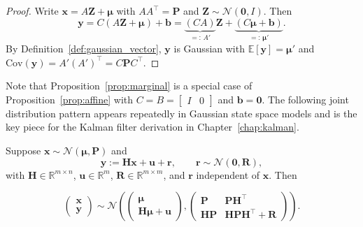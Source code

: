 \begin{proof}
Write $\mathbf{x} = A\mathbf{Z} + \boldsymbol{\mu}$ with $AA^\top = \mathbf{P}$ and $\mathbf{Z} \sim \mathcal{N}(\mathbf{0}, I)$. Then
\[
  \mathbf{y} = C(A\mathbf{Z} + \boldsymbol{\mu}) + \mathbf{b} = \underbrace{(CA)}_{=:\,A'}\mathbf{Z} + \underbrace{(C\boldsymbol{\mu}+\mathbf{b})}_{=:\,\boldsymbol{\mu}'}.
\]
By Definition~\ref{def:gaussian_vector}, $\mathbf{y}$ is Gaussian with $\mathbb{E}[\mathbf{y}] = \boldsymbol{\mu}'$ and $\mathrm{Cov}(\mathbf{y}) = A'(A')^\top = C\mathbf{P}C^\top$.
\end{proof}
Note that Proposition~\ref{prop:marginal} is a special case of Proposition~\ref{prop:affine} with $C = B = \begin{bmatrix}I & 0\end{bmatrix}$ and $\mathbf{b} = \mathbf{0}$. The following joint distribution pattern appears repeatedly in Gaussian state space models and is the key piece for the Kalman filter derivation in Chapter~\ref{chap:kalman}.

\begin{proposition}\label{prop:joint}
Suppose $\mathbf{x} \sim \mathcal{N}(\boldsymbol{\mu}, \mathbf{P})$ and
\begin{equation}\label{eq:linear_obs}
  \mathbf{y} := \mathbf{H}\mathbf{x} + \mathbf{u} + \mathbf{r},
  \qquad \mathbf{r} \sim \mathcal{N}(\mathbf{0}, \mathbf{R}),
\end{equation}
with $\mathbf{H} \in \mathbb{R}^{m \times n}$, $\mathbf{u} \in \mathbb{R}^m$, $\mathbf{R} \in \mathbb{R}^{m \times m}$, and $\mathbf{r}$ independent of $\mathbf{x}$. Then

\begin{equation}\label{eq:joint_linear}
  \begin{pmatrix}
  \mathbf{x}\\
  \mathbf{y}
  \end{pmatrix}
  \sim \mathcal{N}\left(
    \begin{pmatrix}
    \boldsymbol{\mu}\\
    \mathbf{H}\boldsymbol{\mu}+\mathbf{u}
    \end{pmatrix},
    \begin{pmatrix}
      \mathbf{P} & \mathbf{P}\mathbf{H}^\top\\
      \mathbf{H}\mathbf{P} & \mathbf{H}\mathbf{P}\mathbf{H}^\top + \mathbf{R}
    \end{pmatrix}
  \right).
\end{equation}
\end{proposition}


